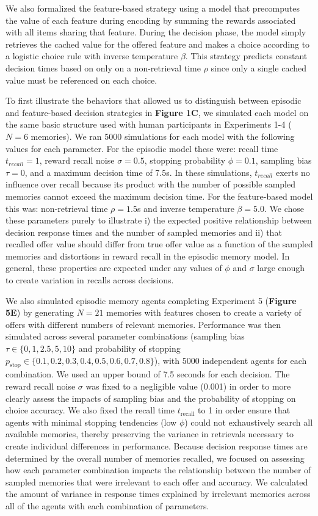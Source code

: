\documentclass[10pt,letterpaper]{article}
\begin{document}
We also formalized the feature-based strategy using a model that precomputes the value of each feature during encoding by summing the rewards associated with all items sharing that feature. During the decision phase, the model simply retrieves the cached value for the offered feature and makes a choice according to a logistic choice rule with inverse temperature $\beta$. This strategy predicts constant decision times based on only on a non-retrieval time $\rho$ since only a single cached value must be referenced on each choice.

To first illustrate the behaviors that allowed us to distinguish between episodic and feature-based decision strategies in \textbf{Figure 1C}, we simulated each model on the same basic structure used with human participants in Experiments 1-4 ($N=6$ memories). We ran 5000 simulations for each model with the following values for each parameter. For the episodic model these were: recall time $t_{recall} = 1$, reward recall noise $\sigma = 0.5$, stopping probability $\phi = 0.1$, sampling bias $\tau = 0$, and a maximum decision time of 7.5s. In these simulations, $t_{recall}$ exerts no influence over recall because its product with the number of possible sampled memories cannot exceed the maximum decision time. For the feature-based model this was: non-retrieval time $\rho = 1.5$s and inverse temperature $\beta = 5.0$. We chose these parameters purely to illustrate i) the expected positive relationship between decision response times and the number of sampled memories and ii) that recalled offer value should differ from true offer value as a function of the sampled memories and distortions in reward recall in the episodic memory model. In general, these properties are expected under any values of $\phi$ and $\sigma$ large enough to create variation in recalls across decisions.

We also simulated episodic memory agents completing Experiment 5 (\textbf{Figure 5E}) by generating $N = 21$ memories with features chosen to create a variety of offers with different numbers of relevant memories. Performance was then simulated across several parameter combinations (sampling bias $\tau \in \{0, 1, 2.5, 5, 10\}$ and probability of stopping $p_{\text{stop}} \in \{0.1, 0.2, 0.3, 0.4, 0.5, 0.6, 0.7, 0.8\}$), with 5000 independent agents for each combination. We used an upper bound of 7.5 seconds for each decision. The reward recall noise $\sigma$ was fixed to a negligible value (0.001) in order to more clearly assess the impacts of sampling bias and the probability of stopping on choice accuracy. We also fixed the recall time $t_{\text{recall}}$ to 1 in order ensure that agents with minimal stopping tendencies (low $\phi$) could not exhaustively search all available memories, thereby preserving the variance in retrievals necessary to create individual differences in performance. Because decision response times are determined by the overall number of memories recalled, we focused on assessing how each parameter combination impacts the relationship between the number of sampled memories that were irrelevant to each offer and accuracy. We calculated the amount of variance in response times explained by irrelevant memories across all of the agents with each combination of parameters.
\end{document}
